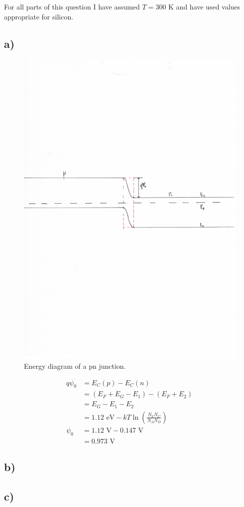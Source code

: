 For all parts of this question I have assumed $T = 300 \textrm{ K}$ and have used values appropriate for silicon.
\subsection*{a)}
	\begin{figure}[htbp!]
		\flushright
		\includegraphics[trim={3.5cm 12.5cm 2.5cm 11cm},clip]{./img/2a}
		\caption{Energy diagram of a pn junction.}
	\end{figure}
	\[
	\begin{aligned}
		q \psi_0 &= E_C(p) - E_C(n) \\
			   &= (E_F + E_G - E_1) - (E_F + E_2) \\
			   &= E_G - E_1 - E_2 \\
			   &= 1.12 \textrm{ eV} - k T \ln \left( \frac{N_V N_C}{N_A N_D} \right) \\
			\psi_0  &=	1.12 \textrm{ V} - 0.147 \textrm{ V} \\
			   &= 0.973 \textrm{ V}	   
	\end{aligned}
	\]
\subsection*{b)}
\subsection*{c)}
	
